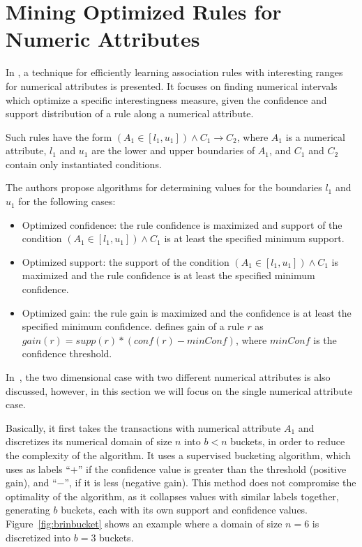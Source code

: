 \section{Mining Optimized Rules for Numeric Attributes}
\label{sec:rw-miningOptimizedRules}

In \citet{Brin99miningoptimized}, a technique for efficiently learning association rules with interesting ranges for
numerical attributes is presented. It focuses on finding numerical intervals which optimize a specific interestingness
measure, given the confidence and support distribution of a rule along a numerical attribute. 

Such rules have the form $(A_1 \in [l_1,u_1]) \wedge C_1 \rightarrow C_2$, where
$A_1$ is a numerical attribute, $l_1$ and $u_1$ are the lower and upper boundaries of $A_1$, and $C_1$ and $C_2$
contain
only instantiated conditions.

The authors propose algorithms for determining values for the boundaries $l_1$ and $u_1$ for the following cases:

\begin{itemize}
 \item Optimized confidence: the rule confidence is maximized and  support of the condition $(A_1 \in [l_1,u_1])
\wedge
C_1$ is at least the specified minimum support.
  \item Optimized support: the support of the condition $(A_1 \in [l_1,u_1]) \wedge C_1$ is maximized and the rule
confidence is at least the specified minimum confidence.
  \item Optimized gain: the rule gain is maximized and the confidence is at least the specified minimum confidence.
\citet{Brin99miningoptimized} defines gain of a rule $r$ as $gain(r)= supp(r)*(conf(r)-minConf)$, where $minConf$ is the
confidence threshold.
\end{itemize}

In~\citet{Brin99miningoptimized}, the two dimensional case with two different numerical attributes is also discussed,
however, in this section we will focus on the single numerical attribute case.

Basically, it first takes the transactions with numerical attribute $A_1$ and discretizes its numerical domain of size
$n$ into $b < n$ buckets, in order to reduce the complexity of the algorithm. It uses a supervised bucketing algorithm,
which uses as labels ``$+$'' if the confidence value is greater than the threshold (positive gain), and ``$-$'', if it
is less (negative gain). This method does not compromise the optimality of the algorithm, as it collapses values with
similar labels together, generating $b$ buckets, each with its own support and confidence values.
Figure~\ref{fig:brinbucket} shows an example where a domain of size $n=6$ is discretized into $b=3$ buckets.


